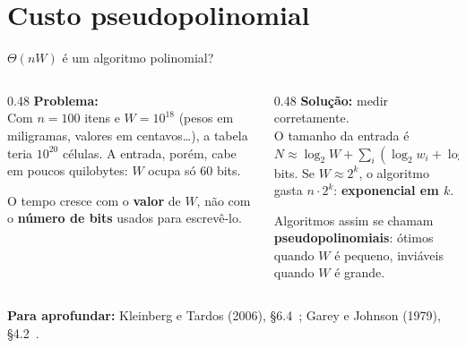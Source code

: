 \documentclass[aspectratio=169,xcolor=table]{beamer}
\newcommand{\fonte}[1]{%
  \vfill
  {\tiny\color{gray!55!black}\textbf{Para aprofundar:} #1\par}%
}
\begin{document}
\section{Custo pseudopolinomial}

\begin{frame}{$\Theta(nW)$ é um algoritmo polinomial?}
  \begin{columns}[T]
    \begin{column}{0.48\textwidth}
      \textbf{Problema:}\\[2pt]
      \scriptsize Com $n=100$ itens e $W = 10^{18}$ (pesos em miligramas, valores em
      centavos\dots), a tabela teria $10^{20}$ células. A entrada, porém, cabe em poucos
      quilobytes: $W$ ocupa só 60 bits.
      \medskip

      O tempo cresce com o \textbf{valor} de $W$, não com o \textbf{número de bits} usados
      para escrevê-lo.
    \end{column}
    \begin{column}{0.48\textwidth}
      \textbf{Solução:} medir corretamente.\\[2pt]
      \scriptsize O tamanho da entrada é
      $N \approx \log_2 W + \sum_i(\log_2 w_i + \log_2 v_i)$ bits. Se $W \approx 2^k$,
      o algoritmo gasta $n\cdot 2^k$: \textbf{exponencial em $k$}.
      \medskip

      Algoritmos assim se chamam \textbf{pseudopolinomiais}: ótimos quando $W$ é pequeno,
      inviáveis quando $W$ é grande.
    \end{column}
  \end{columns}
  \fonte{Kleinberg e Tardos (2006), \S 6.4~\cite{kleinberg2006algorithm};
    Garey e Johnson (1979), \S 4.2~\cite{garey1979computers}.}
\end{frame}
\end{document}
